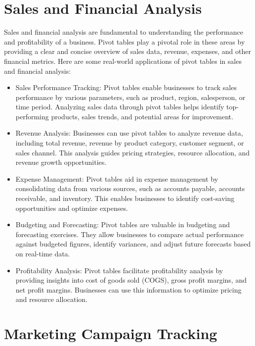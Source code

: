 \documentclass[
]{book}
\begin{document}
\hypertarget{sales-and-financial-analysis}{%
\section{Sales and Financial Analysis}\label{sales-and-financial-analysis}}

Sales and financial analysis are fundamental to understanding the performance and profitability of a business. Pivot tables play a pivotal role in these areas by providing a clear and concise overview of sales data, revenue, expenses, and other financial metrics. Here are some real-world applications of pivot tables in sales and financial analysis:

\begin{itemize}
\item
  Sales Performance Tracking: Pivot tables enable businesses to track sales performance by various parameters, such as product, region, salesperson, or time period. Analyzing sales data through pivot tables helps identify top-performing products, sales trends, and potential areas for improvement.
\item
  Revenue Analysis: Businesses can use pivot tables to analyze revenue data, including total revenue, revenue by product category, customer segment, or sales channel. This analysis guides pricing strategies, resource allocation, and revenue growth opportunities.
\item
  Expense Management: Pivot tables aid in expense management by consolidating data from various sources, such as accounts payable, accounts receivable, and inventory. This enables businesses to identify cost-saving opportunities and optimize expenses.
\item
  Budgeting and Forecasting: Pivot tables are valuable in budgeting and forecasting exercises. They allow businesses to compare actual performance against budgeted figures, identify variances, and adjust future forecasts based on real-time data.
\item
  Profitability Analysis: Pivot tables facilitate profitability analysis by providing insights into cost of goods sold (COGS), gross profit margins, and net profit margins. Businesses can use this information to optimize pricing and resource allocation.
\end{itemize}

\hypertarget{marketing-campaign-tracking}{%
\section{Marketing Campaign Tracking}\label{marketing-campaign-tracking}}
\end{document}
